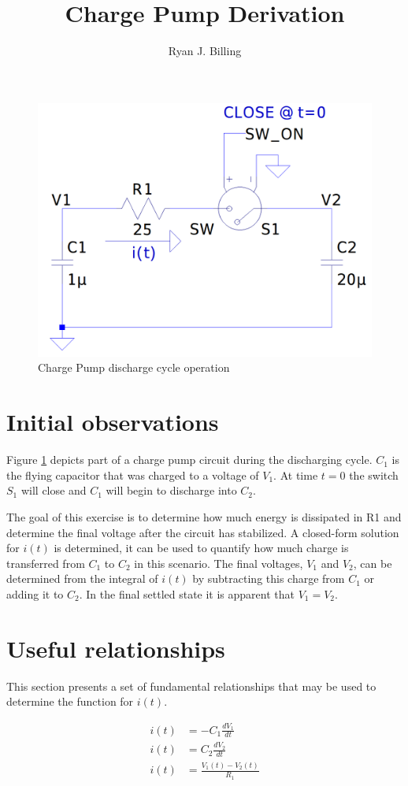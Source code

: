 \documentclass[12pt,letterpaper]{report}
\title{Charge Pump Derivation}
\author{Ryan J. Billing}
\begin{document}
	\maketitle
	\begin{figure}
		\centering
		\includegraphics[width=0.7\linewidth]{img/charge_pump_discharge_cycle}
		\caption{Charge Pump discharge cycle operation}
		\label{fig:chargepumpdischargecycle}
	\end{figure}
	
	\section{Initial observations}
	Figure \ref{fig:chargepumpdischargecycle} depicts part of a charge pump circuit during the discharging cycle.  $C_1$ is the flying capacitor that was charged to a voltage of $V_1$.  At time $t=0$ the switch $S_1$ will close and $C_1$ will begin to discharge into $C_2$.
	
	The goal of this exercise is to determine how much energy is dissipated in R1 and determine the final voltage after the circuit has stabilized.  A closed-form solution for $i(t)$ is determined, it can be used to quantify how much charge is transferred from $C_1$ to $C_2$ in this scenario.   The final voltages, $V_1$ and $V_2$, can be determined from the integral of $i(t)$ by subtracting this charge from $C_1$ or adding it to $C_2$.  In the final settled state it is apparent that $V_1 = V_2$.
	
	\section{Useful relationships}
	This section presents a set of fundamental relationships that may be used to determine the function for $i(t)$.
	
	\begin{align}
		i(t) &= -C_1 \frac{dV_1}{dt} \label{c1deriv} \\
		i(t) &= C_2 \frac{dV_2}{dt} \label{c2deriv} \\
		i(t) &= \frac{V_1(t) - V_2(t)}{R_1} \label{itV}
	\end{align}
\end{document}
